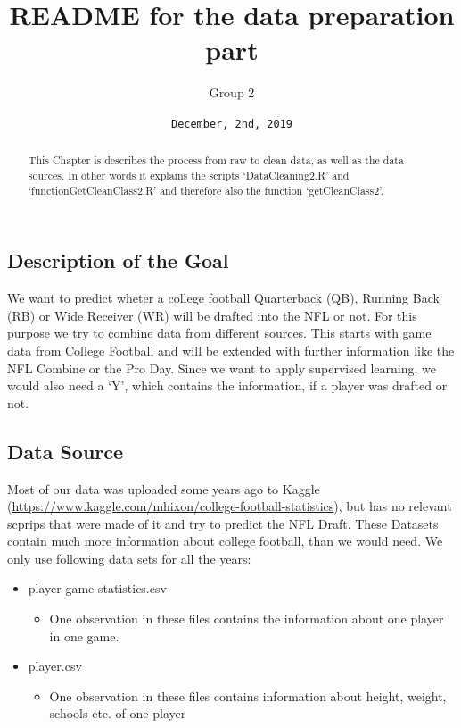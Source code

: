 \documentclass[]{article}
\title{README for the data preparation part}
\author{Group 2}
\date{\texttt{December,\ 2nd,\ 2019}}
\providecommand{\tightlist}{%
  \setlength{\itemsep}{0pt}\setlength{\parskip}{0pt}}
\begin{document}
\maketitle
\begin{abstract}
This Chapter is describes the process from raw to clean data, as well as
the data sources. In other words it explains the scripts
`DataCleaning2.R' and `functionGetCleanClass2.R' and therefore also the
function `getCleanClass2'.
\end{abstract}

\hypertarget{description-of-the-goal}{%
\subsection{Description of the Goal}\label{description-of-the-goal}}

We want to predict wheter a college football Quarterback (QB), Running
Back (RB) or Wide Receiver (WR) will be drafted into the NFL or not. For
this purpose we try to combine data from different sources. This starts
with game data from College Football and will be extended with further
information like the NFL Combine or the Pro Day. Since we want to apply
supervised learning, we would also need a `Y', which contains the
information, if a player was drafted or not.

\hypertarget{data-source}{%
\subsection{Data Source}\label{data-source}}

Most of our data was uploaded some years ago to Kaggle
(\url{https://www.kaggle.com/mhixon/college-football-statistics}), but
has no relevant scprips that were made of it and try to predict the NFL
Draft. These Datasets contain much more information about college
football, than we would need. We only use following data sets for all
the years:

\begin{itemize}
\tightlist
\item
  player-game-statistics.csv

  \begin{itemize}
  \tightlist
  \item
    One observation in these files contains the information about one
    player in one game.
  \end{itemize}
\item
  player.csv

  \begin{itemize}
  \tightlist
  \item
    One observation in these files contains information about height,
    weight, schools etc. of one player
  \end{itemize}
\end{itemize}
\end{document}
